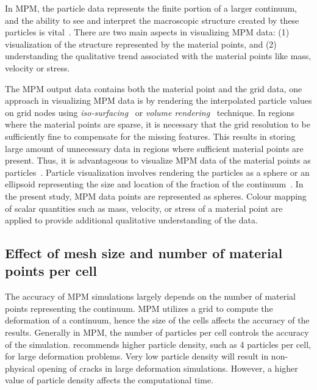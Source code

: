 In MPM, the particle data represents the finite portion of a larger 
continuum, and the ability to see and interpret the 
macroscopic structure created by these particles is vital~\citep{bigler2006}. 
There are two main aspects in visualizing MPM data: (1) visualization of 
the structure represented by the material points, and (2) understanding the 
qualitative trend associated with the material points like mass, velocity or 
stress. 

The MPM output data contains both the material point and the grid data, 
one approach in visualizing MPM data is by rendering the interpolated 
particle values on grid nodes using \textit{iso-surfacing}~\citep{lorensen1987} 
or \textit{volume rendering}~\citep{levoy1988} technique. In regions where the 
material points are sparse, it is necessary that the grid resolution to be 
sufficiently fine to compensate for the missing features. This results in 
storing large amount of unnecessary data in regions where sufficient material 
points are present. Thus, it is advantageous to visualize MPM data of the 
material points as particles~\citep{bigler2006}. Particle visualization 
involves rendering the particles as a sphere or an ellipsoid representing the 
size and location of the fraction of the 
continuum~\citep{kuester2001,krogh1997,gumhold2003}. In the present study, MPM 
data points are represented as spheres.  Colour mapping of scalar 
quantities such as mass, velocity, or stress of a material point are applied to 
provide additional qualitative understanding of the data.



\subsection{Effect of mesh size and number of material points per cell}
\label{sec:MPM_points_per_cell}

The accuracy of MPM simulations largely depends on the number of material 
points representing the continuum. MPM utilizes a grid to compute the 
deformation of a continuum, hence the size of the cells affects the accuracy 
of the results. Generally in MPM, the number of particles per cell controls 
the accuracy of the simulation. \citet{Guilkey2003} recommends higher particle 
density, such as 4 particles per cell, for large deformation problems. Very low 
particle density will result in non-physical opening of cracks in large 
deformation simulations. However, a higher value of particle density affects 
the computational time. 

